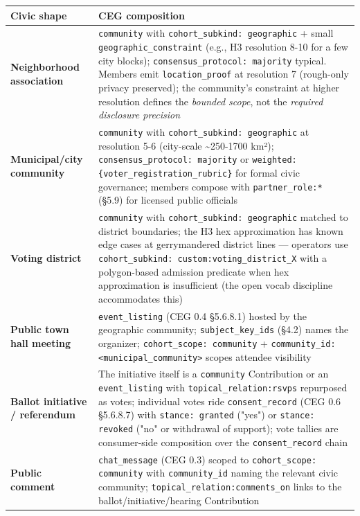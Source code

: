 \documentclass[11pt]{article}
\begin{document}
{\footnotesize
\begin{longtable}{|p{8.0cm}|p{8.0cm}|}\hline
\textbf{Civic shape} & \textbf{CEG composition} \\ \hline\endhead
\textbf{Neighborhood association} & \texttt{community} with \texttt{cohort\_subkind: geographic} + small \texttt{geographic\_constraint} (e.g., H3 resolution 8-10 for a few city blocks); \texttt{consensus\_protocol: majority} typical. Members emit \texttt{location\_proof} at resolution 7 (rough-only privacy preserved); the community's constraint at higher resolution defines the \textit{bounded scope}, not the \textit{required disclosure precision} \\ \hline
\textbf{Municipal/city community} & \texttt{community} with \texttt{cohort\_subkind: geographic} at resolution 5-6 (city-scale \textasciitilde{}250-1700 km²); \texttt{consensus\_protocol: majority} or \texttt{weighted:\{voter\_registration\_rubric\}} for formal civic governance; members compose with \texttt{partner\_role:*} (§5.9) for licensed public officials \\ \hline
\textbf{Voting district} & \texttt{community} with \texttt{cohort\_subkind: geographic} matched to district boundaries; the H3 hex approximation has known edge cases at gerrymandered district lines — operators use \texttt{cohort\_subkind: custom:voting\_district\_X} with a polygon-based admission predicate when hex approximation is insufficient (the open vocab discipline accommodates this) \\ \hline
\textbf{Public town hall meeting} & \texttt{event\_listing} (CEG 0.4 §5.6.8.1) hosted by the geographic community; \texttt{subject\_key\_ids} (§4.2) names the organizer; \texttt{cohort\_scope: community} + \texttt{community\_id: <municipal\_community>} scopes attendee visibility \\ \hline
\textbf{Ballot initiative / referendum} & The initiative itself is a \texttt{community} Contribution or an \texttt{event\_listing} with \texttt{topical\_relation:rsvps} repurposed as votes; individual votes ride \texttt{consent\_record} (CEG 0.6 §5.6.8.7) with \texttt{stance: granted} ("yes") or \texttt{stance: revoked} ("no" or withdrawal of support); vote tallies are consumer-side composition over the \texttt{consent\_record} chain \\ \hline
\textbf{Public comment} & \texttt{chat\_message} (CEG 0.3) scoped to \texttt{cohort\_scope: community} with \texttt{community\_id} naming the relevant civic community; \texttt{topical\_relation:comments\_on} links to the ballot/initiative/hearing Contribution \\ \hline

\end{longtable}}
\end{document}
